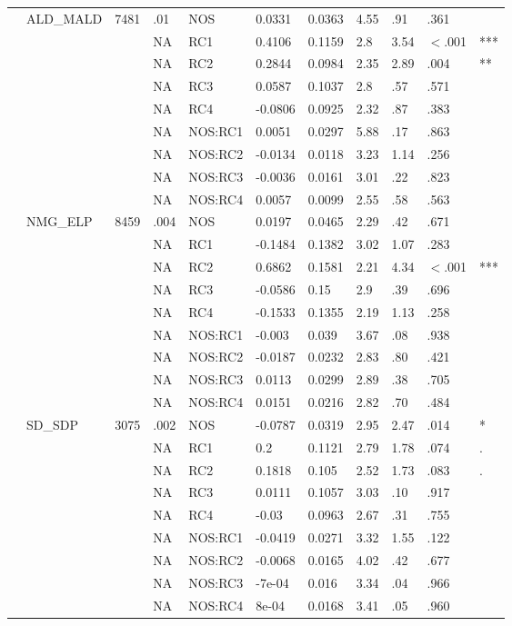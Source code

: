 \begin{table}[ht]
\begin{tabular}{lllllllllll}
   & ALD\_MALD & 7481 & .01 & NOS & 0.0331 & 0.0363 & 4.55 & .91 & .361 &   \\ 
   &  &  & NA & RC1 & 0.4106 & 0.1159 & 2.8 & 3.54 & $<$.001 & *** \\ 
   &  &  & NA & RC2 & 0.2844 & 0.0984 & 2.35 & 2.89 & .004 & ** \\ 
   &  &  & NA & RC3 & 0.0587 & 0.1037 & 2.8 & .57 & .571 &   \\ 
   &  &  & NA & RC4 & -0.0806 & 0.0925 & 2.32 & .87 & .383 &   \\ 
   &  &  & NA & NOS:RC1 & 0.0051 & 0.0297 & 5.88 & .17 & .863 &   \\ 
   &  &  & NA & NOS:RC2 & -0.0134 & 0.0118 & 3.23 & 1.14 & .256 &   \\ 
   &  &  & NA & NOS:RC3 & -0.0036 & 0.0161 & 3.01 & .22 & .823 &   \\ 
   &  &  & NA & NOS:RC4 & 0.0057 & 0.0099 & 2.55 & .58 & .563 &   \\ 
   & NMG\_ELP & 8459 & .004 & NOS & 0.0197 & 0.0465 & 2.29 & .42 & .671 &   \\ 
   &  &  & NA & RC1 & -0.1484 & 0.1382 & 3.02 & 1.07 & .283 &   \\ 
   &  &  & NA & RC2 & 0.6862 & 0.1581 & 2.21 & 4.34 & $<$.001 & *** \\ 
   &  &  & NA & RC3 & -0.0586 & 0.15 & 2.9 & .39 & .696 &   \\ 
   &  &  & NA & RC4 & -0.1533 & 0.1355 & 2.19 & 1.13 & .258 &   \\ 
   &  &  & NA & NOS:RC1 & -0.003 & 0.039 & 3.67 & .08 & .938 &   \\ 
   &  &  & NA & NOS:RC2 & -0.0187 & 0.0232 & 2.83 & .80 & .421 &   \\ 
   &  &  & NA & NOS:RC3 & 0.0113 & 0.0299 & 2.89 & .38 & .705 &   \\ 
   &  &  & NA & NOS:RC4 & 0.0151 & 0.0216 & 2.82 & .70 & .484 &   \\ 
   & SD\_SDP & 3075 & .002 & NOS & -0.0787 & 0.0319 & 2.95 & 2.47 & .014 & * \\ 
   &  &  & NA & RC1 & 0.2 & 0.1121 & 2.79 & 1.78 & .074 & . \\ 
   &  &  & NA & RC2 & 0.1818 & 0.105 & 2.52 & 1.73 & .083 & . \\ 
   &  &  & NA & RC3 & 0.0111 & 0.1057 & 3.03 & .10 & .917 &   \\ 
   &  &  & NA & RC4 & -0.03 & 0.0963 & 2.67 & .31 & .755 &   \\ 
   &  &  & NA & NOS:RC1 & -0.0419 & 0.0271 & 3.32 & 1.55 & .122 &   \\ 
   &  &  & NA & NOS:RC2 & -0.0068 & 0.0165 & 4.02 & .42 & .677 &   \\ 
   &  &  & NA & NOS:RC3 & -7e-04 & 0.016 & 3.34 & .04 & .966 &   \\ 
   &  &  & NA & NOS:RC4 & 8e-04 & 0.0168 & 3.41 & .05 & .960 &   \\ 
   \hline
\end{tabular}
\endgroup
\end{table}
